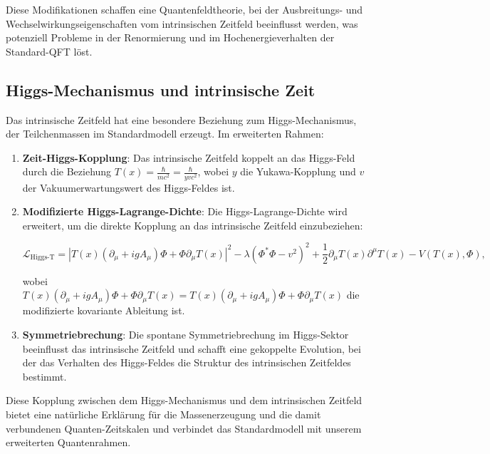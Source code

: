 \documentclass[12pt,a4paper]{article}
\newcommand{\Tfield}{T(x)}
\newcommand{\DhiggsT}{\Tfield (\partial_\mu + ig A_\mu) \Phi + \Phi \partial_\mu \Tfield}
\begin{document}
	Diese Modifikationen schaffen eine Quantenfeldtheorie, bei der Ausbreitungs- und Wechselwirkungseigenschaften vom intrinsischen Zeitfeld beeinflusst werden, was potenziell Probleme in der Renormierung und im Hochenergieverhalten der Standard-QFT löst.
	
	\subsection{Higgs-Mechanismus und intrinsische Zeit}
	\label{subsec:higgs_intrinsic}
	
	Das intrinsische Zeitfeld hat eine besondere Beziehung zum Higgs-Mechanismus, der Teilchenmassen im Standardmodell erzeugt. Im erweiterten Rahmen:
	
	\begin{enumerate}
		\item \textbf{Zeit-Higgs-Kopplung}: Das intrinsische Zeitfeld koppelt an das Higgs-Feld durch die Beziehung $\Tfield = \frac{\hbar}{mc^2} = \frac{\hbar}{y v c^2}$, wobei $y$ die Yukawa-Kopplung und $v$ der Vakuumerwartungswert des Higgs-Feldes ist.
		
		\item \textbf{Modifizierte Higgs-Lagrange-Dichte}: Die Higgs-Lagrange-Dichte wird erweitert, um die direkte Kopplung an das intrinsische Zeitfeld einzubeziehen:
		
		\begin{equation}
			\mathcal{L}_{\text{Higgs-T}} = |\DhiggsT|^2 - \lambda(\Phi^* \Phi - v^2)^2 + \frac{1}{2}\partial_\mu \Tfield \partial^\mu \Tfield - V(\Tfield, \Phi),
			\label{eq:higgs_lagrangian}
		\end{equation}
		
		wobei $\DhiggsT = \Tfield (\partial_\mu + ig A_\mu) \Phi + \Phi \partial_\mu \Tfield$ die modifizierte kovariante Ableitung ist.
		
		\item \textbf{Symmetriebrechung}: Die spontane Symmetriebrechung im Higgs-Sektor beeinflusst das intrinsische Zeitfeld und schafft eine gekoppelte Evolution, bei der das Verhalten des Higgs-Feldes die Struktur des intrinsischen Zeitfeldes bestimmt.
	\end{enumerate}
	
	Diese Kopplung zwischen dem Higgs-Mechanismus und dem intrinsischen Zeitfeld bietet eine natürliche Erklärung für die Massenerzeugung und die damit verbundenen Quanten-Zeitskalen und verbindet das Standardmodell mit unserem erweiterten Quantenrahmen.
	
\end{document}
